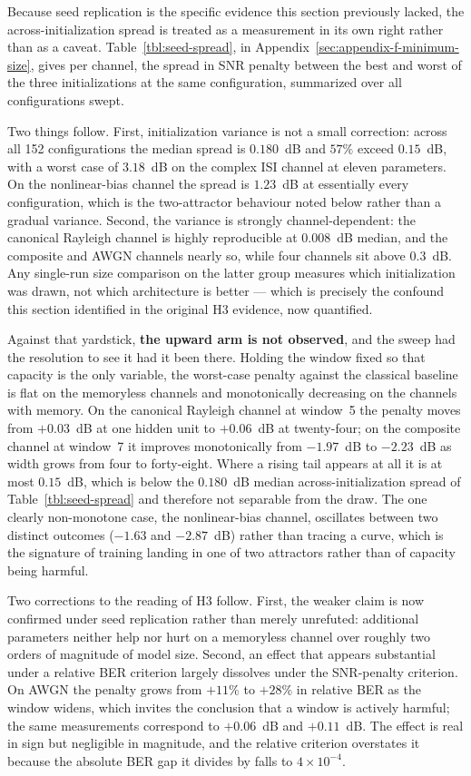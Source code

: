 Because seed replication is the specific evidence this section previously lacked, the across-initialization spread is treated as a measurement in its own right rather than as a caveat. Table~\ref{tbl:seed-spread}, in Appendix~\ref{sec:appendix-f-minimum-size}, gives per channel, the spread in SNR penalty between the best and worst of the three initializations at the same configuration, summarized over all configurations swept.

Two things follow. First, initialization variance is not a small correction: across all 152 configurations the median spread is \(0.180\)~dB and \(57\%\) exceed \(0.15\)~dB, with a worst case of \(3.18\)~dB on the complex ISI channel at eleven parameters. On the nonlinear-bias channel the spread is \(1.23\)~dB at essentially every configuration, which is the two-attractor behaviour noted below rather than a gradual variance. Second, the variance is strongly channel-dependent: the canonical Rayleigh channel is highly reproducible at \(0.008\)~dB median, and the composite and AWGN channels nearly so, while four channels sit above \(0.3\)~dB. Any single-run size comparison on the latter group measures which initialization was drawn, not which architecture is better --- which is precisely the confound this section identified in the original H3 evidence, now quantified.

Against that yardstick, \textbf{the upward arm is not observed}, and the sweep had the resolution to see it had it been there. Holding the window fixed so that capacity is the only variable, the worst-case penalty against the classical baseline is flat on the memoryless channels and monotonically decreasing on the channels with memory. On the canonical Rayleigh channel at window~5 the penalty moves from \(+0.03\)~dB at one hidden unit to \(+0.06\)~dB at twenty-four; on the composite channel at window~7 it improves monotonically from \(-1.97\)~dB to \(-2.23\)~dB as width grows from four to forty-eight. Where a rising tail appears at all it is at most \(0.15\)~dB, which is below the \(0.180\)~dB median across-initialization spread of Table~\ref{tbl:seed-spread} and therefore not separable from the draw. The one clearly non-monotone case, the nonlinear-bias channel, oscillates between two distinct outcomes (\(-1.63\) and \(-2.87\)~dB) rather than tracing a curve, which is the signature of training landing in one of two attractors rather than of capacity being harmful.

Two corrections to the reading of H3 follow. First, the weaker claim is now confirmed under seed replication rather than merely unrefuted: additional parameters neither help nor hurt on a memoryless channel over roughly two orders of magnitude of model size. Second, an effect that appears substantial under a relative BER criterion largely dissolves under the SNR-penalty criterion. On AWGN the penalty grows from \(+11\%\) to \(+28\%\) in relative BER as the window widens, which invites the conclusion that a window is actively harmful; the same measurements correspond to \(+0.06\)~dB and \(+0.11\)~dB. The effect is real in sign but negligible in magnitude, and the relative criterion overstates it because the absolute BER gap it divides by falls to \(4\times10^{-4}\).

